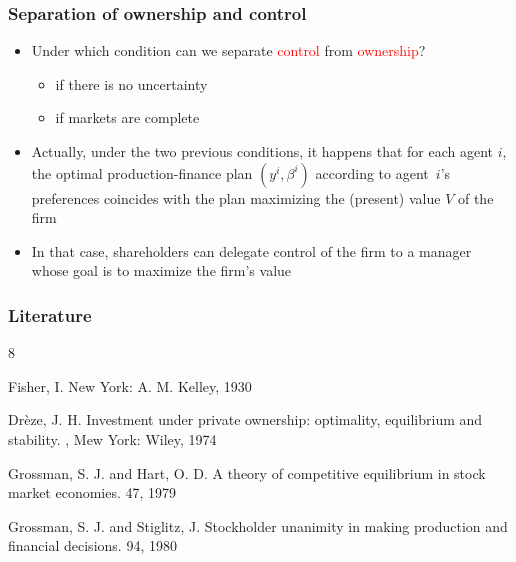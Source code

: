 \documentclass[blue]{beamer}
\theoremstyle{definition}
\theoremstyle{example}
\begin{document}

\begin{frame}\frametitle{Separation of ownership and control}

\begin{itemize}
\item Under which condition can we separate \textcolor{red}{control} from \textcolor{red}{ownership}?
    \begin{itemize}
    \item if there is no uncertainty
    \item if markets are complete
    \end{itemize}
\item Actually, under the two previous conditions, it happens that for each agent $i$, the optimal production-finance plan $(y^i,\beta^i)$ according to agent~$i$'s preferences coincides with the
plan maximizing the (present) value $V$ of the firm
\item In that case, shareholders can delegate control of the firm to a manager whose goal is to maximize the firm's value
\end{itemize}

\end{frame}


\begin{frame}\frametitle{Literature}

\begin{thebibliography}{8}

\begin{small}

  \beamertemplatearticlebibitems

    Fisher, I.
    \newblock New York: A. M. Kelley, 1930

    Dr\`eze, J. H.
    \newblock Investment under private ownership: optimality, equilibrium and stability.
    , Mew York: Wiley, 1974

   Grossman, S. J. and Hart, O. D.
    \newblock A theory of competitive equilibrium in stock market economies.
     47, 1979

   Grossman, S. J. and Stiglitz, J.
    \newblock Stockholder unanimity in making production and financial decisions.
     94, 1980

\end{small}


    \end{thebibliography}


\end{frame}
\end{document}
